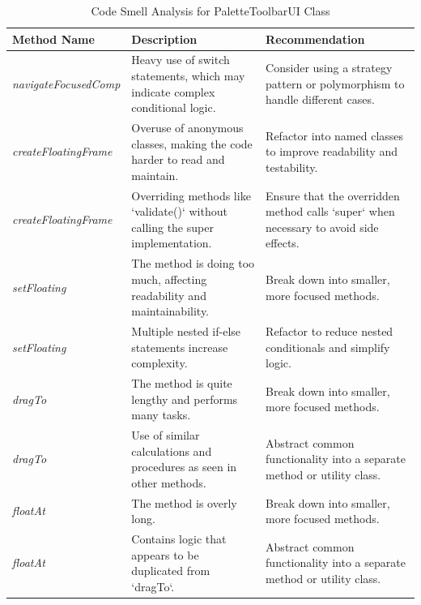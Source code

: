 \begin{table}[H]
    \centering
    \begin{tabular}{|l|p{6cm}|p{6cm}|}
        \hline
        \textbf{Method Name}         & \textbf{Description}                                                           & \textbf{Recommendation}                                                               \\ \hline
        \textit{navigateFocusedComp} & Heavy use of switch statements, which may indicate complex conditional logic.  & Consider using a strategy pattern or polymorphism to handle different cases.          \\ \hline
        \textit{createFloatingFrame} & Overuse of anonymous classes, making the code harder to read and maintain.     & Refactor into named classes to improve readability and testability.                   \\ \hline
        \textit{createFloatingFrame} & Overriding methods like `validate()` without calling the super implementation. & Ensure that the overridden method calls `super` when necessary to avoid side effects. \\ \hline
        \textit{setFloating}         & The method is doing too much, affecting readability and maintainability.       & Break down into smaller, more focused methods.                                        \\ \hline
        \textit{setFloating}         & Multiple nested if-else statements increase complexity.                        & Refactor to reduce nested conditionals and simplify logic.                            \\ \hline
        \textit{dragTo}              & The method is quite lengthy and performs many tasks.                           & Break down into smaller, more focused methods.                                        \\ \hline
        \textit{dragTo}              & Use of similar calculations and procedures as seen in other methods.           & Abstract common functionality into a separate method or utility class.                \\ \hline
        \textit{floatAt}             & The method is overly long.                                                     & Break down into smaller, more focused methods.                                        \\ \hline
        \textit{floatAt}             & Contains logic that appears to be duplicated from `dragTo`.                    & Abstract common functionality into a separate method or utility class.                \\ \hline
    \end{tabular}
    \caption{Code Smell Analysis for PaletteToolbarUI Class}
    \label{table:codesmell-palette}
\end{table}






